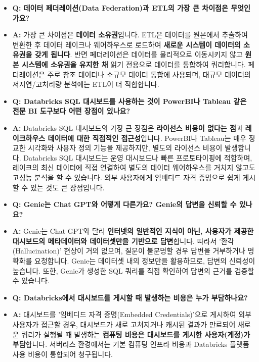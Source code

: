 \documentclass[11pt,a4paper]{article}
\begin{document}
\begin{tcolorbox}[mybox={FAQ: 궁금증 해소}]
\begin{itemize}
    \item \textbf{Q: 데이터 페더레이션(Data Federation)과 ETL의 가장 큰 차이점은 무엇인가요?}
    \item \textbf{A:} 가장 큰 차이점은 \textbf{데이터 소유권}입니다. ETL은 데이터를 원본에서 추출하여 변환한 후 데이터 레이크나 웨어하우스로 로드하여 \textbf{새로운 시스템이 데이터의 소유권을 갖게 됩니다}. 반면 페더레이션은 데이터를 물리적으로 이동시키지 않고 \textbf{원본 시스템에 소유권을 유지한 채} 읽기 전용으로 데이터를 통합하여 쿼리합니다. 페더레이션은 주로 참조 데이터나 소규모 데이터 통합에 사용되며, 대규모 데이터의 저지연/고처리량 분석에는 ETL이 더 적합합니다.

    \item \textbf{Q: Databricks SQL 대시보드를 사용하는 것이 PowerBI나 Tableau 같은 전문 BI 도구보다 어떤 장점이 있나요?}
    \item \textbf{A:} Databricks SQL 대시보드의 가장 큰 장점은 \textbf{라이선스 비용이 없다는 점}과 \textbf{레이크하우스 데이터에 대한 직접적인 접근성}입니다. PowerBI나 Tableau는 매우 정교한 시각화와 사용자 정의 기능을 제공하지만, 별도의 라이선스 비용이 발생합니다. Databricks SQL 대시보드는 운영 대시보드나 빠른 프로토타이핑에 적합하며, 레이크의 최신 데이터에 직접 연결하여 별도의 데이터 웨어하우스를 거치지 않고도 고성능 분석을 할 수 있습니다. 외부 사용자에게 임베디드 자격 증명으로 쉽게 게시할 수 있는 것도 큰 장점입니다.

    \item \textbf{Q: Genie는 Chat GPT와 어떻게 다른가요? Genie의 답변을 신뢰할 수 있나요?}
    \item \textbf{A:} Genie는 Chat GPT와 달리 \textbf{인터넷의 일반적인 지식이 아닌, 사용자가 제공한 대시보드의 메타데이터와 데이터셋만을 기반으로 답변}합니다. 따라서 '환각(Hallucination)' 현상이 거의 없으며, 질문이 불분명할 경우 답변을 거부하거나 명확화를 요청합니다. Genie는 데이터셋 내의 정보만을 활용하므로, 답변의 신뢰성이 높습니다. 또한, Genie가 생성한 SQL 쿼리를 직접 확인하여 답변의 근거를 검증할 수 있습니다.

    \item \textbf{Q: Databricks에서 대시보드를 게시할 때 발생하는 비용은 누가 부담하나요?}
    \item \textbf{A:} 대시보드를 '임베디드 자격 증명(Embedded Credentials)'으로 게시하여 외부 사용자가 접근할 경우, 대시보드가 새로 고쳐지거나 캐시된 결과가 만료되어 새로운 쿼리가 실행될 때 발생하는 \textbf{컴퓨팅 비용은 대시보드를 게시한 사용자(계정)가 부담}합니다. 서버리스 환경에서는 기본 컴퓨팅 인프라 비용과 Databricks 플랫폼 사용 비용이 통합되어 청구됩니다.


\end{itemize}
\end{tcolorbox}
\end{document}
